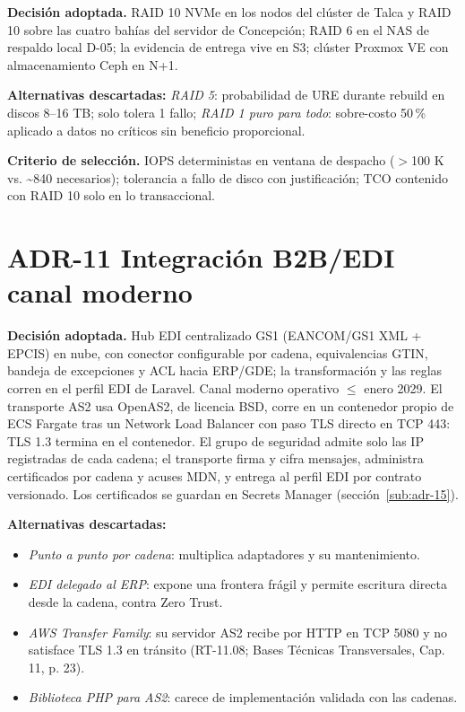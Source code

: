 \textbf{Decisión adoptada.} RAID 10 NVMe en los nodos del clúster de Talca y RAID 10 sobre las cuatro bahías del servidor de Concepción; RAID 6 en el NAS de respaldo local D-05; la evidencia de entrega vive en S3; clúster Proxmox VE con almacenamiento Ceph en N+1.

\textbf{Alternativas descartadas:} \emph{RAID 5}: probabilidad de URE durante rebuild en discos 8--16 TB; solo tolera 1 fallo; \emph{RAID 1 puro para todo}: sobre-costo 50\,\% aplicado a datos no críticos sin beneficio proporcional.

\textbf{Criterio de selección.} IOPS deterministas en ventana de despacho ($>$100 K vs. \textasciitilde{}840 necesarios); tolerancia a fallo de disco con justificación; TCO contenido con RAID 10 solo en lo transaccional.

\section{ADR-11 \textperiodcentered{} Integración B2B/EDI canal moderno}
\label{sub:adr-11}

\textbf{Decisión adoptada.} Hub EDI centralizado GS1 (EANCOM/GS1 XML + EPCIS) en nube, con conector configurable por cadena, equivalencias GTIN, bandeja de excepciones y ACL hacia ERP/GDE; la transformación y las reglas corren en el perfil EDI de Laravel. Canal moderno operativo $\leq$ enero 2029. El transporte AS2 usa OpenAS2, de licencia BSD, corre en un contenedor propio de ECS Fargate tras un Network Load Balancer con paso TLS directo en TCP 443: TLS 1.3 termina en el contenedor. El grupo de seguridad admite solo las IP registradas de cada cadena; el transporte firma y cifra mensajes, administra certificados por cadena y acuses MDN, y entrega al perfil EDI por contrato versionado. Los certificados se guardan en Secrets Manager (sección~\ref{sub:adr-15}).

\textbf{Alternativas descartadas:}

\begin{itemize}
  \item \emph{Punto a punto por cadena}: multiplica adaptadores y su mantenimiento.
  \item \emph{EDI delegado al ERP}: expone una frontera frágil y permite escritura directa desde la cadena, contra Zero Trust.
  \item \emph{AWS Transfer Family}: su servidor AS2 recibe por HTTP en TCP 5080 y no satisface TLS 1.3 en tránsito (RT-11.08; Bases Técnicas Transversales, Cap. 11, p. 23).
  \item \emph{Biblioteca PHP para AS2}: carece de implementación validada con las cadenas.
\end{itemize}

